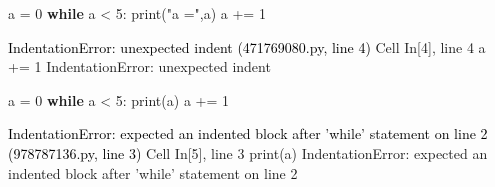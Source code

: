 \documentclass[
  spanish,
  letterpaper,
]{scrbook}
\newenvironment{Shaded}{\begin{snugshade}}{\end{snugshade}}
\newcommand{\BuiltInTok}[1]{\textcolor[rgb]{0.00,0.23,0.31}{#1}}
\newcommand{\ControlFlowTok}[1]{\textcolor[rgb]{0.00,0.23,0.31}{\textbf{#1}}}
\newcommand{\DecValTok}[1]{\textcolor[rgb]{0.68,0.00,0.00}{#1}}
\newcommand{\NormalTok}[1]{\textcolor[rgb]{0.00,0.23,0.31}{#1}}
\newcommand{\OperatorTok}[1]{\textcolor[rgb]{0.37,0.37,0.37}{#1}}
\newcommand{\StringTok}[1]{\textcolor[rgb]{0.13,0.47,0.30}{#1}}
\theoremstyle{definition}
\theoremstyle{remark}
\begin{document}
\begin{Shaded}
\begin{Highlighting}[]
\NormalTok{a }\OperatorTok{=} \DecValTok{0}
\ControlFlowTok{while}\NormalTok{ a }\OperatorTok{\textless{}} \DecValTok{5}\NormalTok{: }
 \BuiltInTok{print}\NormalTok{(}\StringTok{"a ="}\NormalTok{,a)}
\NormalTok{   a }\OperatorTok{+=} \DecValTok{1}
\end{Highlighting}
\end{Shaded}

\begin{Highlighting}
\textcolor{black}{IndentationError: unexpected indent (471769080.py, line 4)}
\textcolor{black}{  }\textcolor{QuartoInternalColor3}{Cell}\textcolor{QuartoInternalColor2}{}\textcolor{QuartoInternalColor3}{ }\textcolor{QuartoInternalColor2}{}\textcolor{QuartoInternalColor4}{In[4]}\textcolor{QuartoInternalColor2}{}\textcolor{QuartoInternalColor4}{, line 4}\textcolor{QuartoInternalColor2}{}
\textcolor{QuartoInternalColor2}{}\textcolor{QuartoInternalColor1}{    }\textcolor{QuartoInternalColor2}{}\textcolor{QuartoInternalColor1}{a += 1}\textcolor{QuartoInternalColor2}{}
\textcolor{QuartoInternalColor2}{    \textasciicaret{}}
\textcolor{QuartoInternalColor2}{}\textcolor{QuartoInternalColor1}{IndentationError}\textcolor{QuartoInternalColor2}{}\textcolor{QuartoInternalColor1}{:}\textcolor{QuartoInternalColor2}{ unexpected indent}
\end{Highlighting}

\begin{Shaded}
\begin{Highlighting}[]
\NormalTok{a }\OperatorTok{=} \DecValTok{0}
\ControlFlowTok{while}\NormalTok{ a }\OperatorTok{\textless{}} \DecValTok{5}\NormalTok{: }
\BuiltInTok{print}\NormalTok{(a)}
\NormalTok{a }\OperatorTok{+=} \DecValTok{1}
\end{Highlighting}
\end{Shaded}

\begin{Highlighting}
\textcolor{black}{IndentationError: expected an indented block after 'while' statement on line 2 (978787136.py, line 3)}
\textcolor{black}{  }\textcolor{QuartoInternalColor3}{Cell}\textcolor{QuartoInternalColor2}{}\textcolor{QuartoInternalColor3}{ }\textcolor{QuartoInternalColor2}{}\textcolor{QuartoInternalColor4}{In[5]}\textcolor{QuartoInternalColor2}{}\textcolor{QuartoInternalColor4}{, line 3}\textcolor{QuartoInternalColor2}{}
\textcolor{QuartoInternalColor2}{}\textcolor{QuartoInternalColor1}{    }\textcolor{QuartoInternalColor2}{}\textcolor{QuartoInternalColor1}{print(a)}\textcolor{QuartoInternalColor2}{}
\textcolor{QuartoInternalColor2}{    \textasciicaret{}}
\textcolor{QuartoInternalColor2}{}\textcolor{QuartoInternalColor1}{IndentationError}\textcolor{QuartoInternalColor2}{}\textcolor{QuartoInternalColor1}{:}\textcolor{QuartoInternalColor2}{ expected an indented block after 'while' statement on line 2}
\end{Highlighting}
\end{document}
